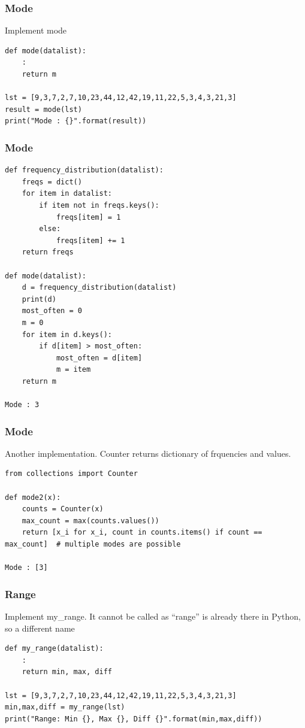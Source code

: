 \begin{frame}[fragile]\frametitle{Mode}
Implement mode
\begin{lstlisting}
def mode(datalist):
	:
	return m

lst = [9,3,7,2,7,10,23,44,12,42,19,11,22,5,3,4,3,21,3]
result = mode(lst)
print("Mode : {}".format(result))
\end{lstlisting}
\end{frame}

\begin{frame}[fragile]\frametitle{Mode}
\begin{lstlisting}
def frequency_distribution(datalist):
	freqs = dict()
	for item in datalist:
		if item not in freqs.keys():
			freqs[item] = 1
		else:
			freqs[item] += 1
	return freqs

def mode(datalist):
    d = frequency_distribution(datalist)
    print(d)
    most_often = 0
    m = 0
    for item in d.keys():
        if d[item] > most_often:
            most_often = d[item]
            m = item
    return m

Mode : 3
\end{lstlisting}
\end{frame}

\begin{frame}[fragile]\frametitle{Mode}
Another implementation. Counter returns dictionary of frquencies and values.
\begin{lstlisting}
from collections import Counter

def mode2(x):
    counts = Counter(x)
    max_count = max(counts.values())
    return [x_i for x_i, count in counts.items() if count == max_count]  # multiple modes are possible

Mode : [3]
\end{lstlisting}
\end{frame}

\begin{frame}[fragile]\frametitle{Range}
Implement my\_range. It cannot be called as ``range'' is already there in Python, so a different name
\begin{lstlisting}
def my_range(datalist):
	:
	return min, max, diff

lst = [9,3,7,2,7,10,23,44,12,42,19,11,22,5,3,4,3,21,3]
min,max,diff = my_range(lst)
print("Range: Min {}, Max {}, Diff {}".format(min,max,diff))
\end{lstlisting}
\end{frame}


